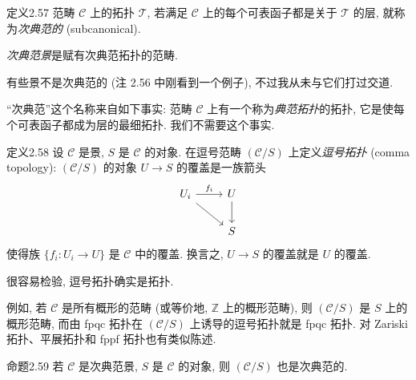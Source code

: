 \begin{origstatement}{定义}{2.57}\label{ch02:def257}
范畴 $\mathcal C$ 上的拓扑 $\mathcal T$, 若满足 $\mathcal C$ 上的每个可表函子都是关于 $\mathcal T$ 的层, 就称为\emph{次典范的} (subcanonical).

\emph{次典范景}是赋有次典范拓扑的范畴.
\end{origstatement}

有些景不是次典范的 (注 2.56 中刚看到一个例子), 不过我从未与它们打过交道.

“次典范”这个名称来自如下事实: 范畴 $\mathcal C$ 上有一个称为\emph{典范拓扑}的拓扑, 它是使每个可表函子都成为层的最细拓扑. 我们不需要这个事实.

\begin{origstatement}{定义}{2.58}\label{ch02:def258}
设 $\mathcal C$ 是景, $S$ 是 $\mathcal C$ 的对象. 在逗号范畴 $(\mathcal C/S)$ 上定义\emph{逗号拓扑} (comma topology): $(\mathcal C/S)$ 的对象 $U\to S$ 的覆盖是一族箭头
\[
\begin{tikzcd}U_i\arrow[r,"f_i"]\arrow[dr]&U\arrow[d]\\&S\end{tikzcd}
\]
使得族 $\{f_i:U_i\to U\}$ 是 $\mathcal C$ 中的覆盖. 换言之, $U\to S$ 的覆盖就是 $U$ 的覆盖.
\end{origstatement}

很容易检验, 逗号拓扑确实是拓扑.

例如, 若 $\mathcal C$ 是所有概形的范畴 (或等价地, $\mathbb Z$ 上的概形范畴), 则 $(\mathcal C/S)$ 是 $S$ 上的概形范畴, 而由 fpqc 拓扑在 $(\mathcal C/S)$ 上诱导的逗号拓扑就是 fpqc 拓扑. 对 Zariski 拓扑、平展拓扑和 fppf 拓扑也有类似陈述.

\begin{origstatement}{命题}{2.59}\label{ch02:prop259}
若 $\mathcal C$ 是次典范景, $S$ 是 $\mathcal C$ 的对象, 则 $(\mathcal C/S)$ 也是次典范的.
\end{origstatement}

